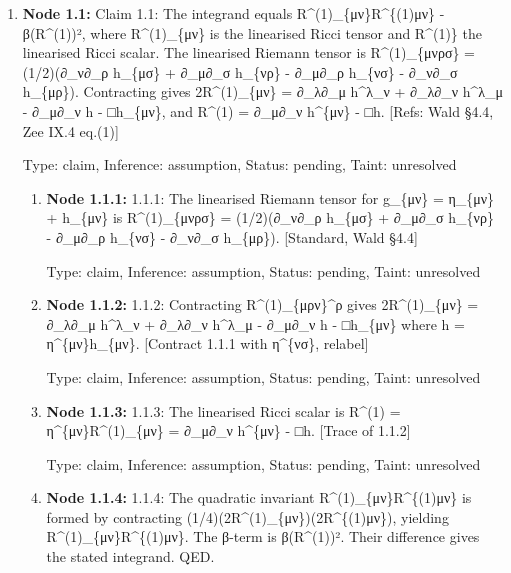 \documentclass{article}
\begin{document}
\begin{enumerate}
\item \textbf{Node 1.1:} Claim 1.1: The integrand equals R\textasciicircum{}(1)\_\{μν\}R\textasciicircum{}\{(1)μν\} - β(R\textasciicircum{}(1))², where R\textasciicircum{}(1)\_\{μν\} is the linearised Ricci tensor and R\textasciicircum{}(1)\} the linearised Ricci scalar. The linearised Riemann tensor is R\textasciicircum{}(1)\_\{μνρσ\} = (1/2)(∂\_ν∂\_ρ h\_\{μσ\} + ∂\_μ∂\_σ h\_\{νρ\} - ∂\_μ∂\_ρ h\_\{νσ\} - ∂\_ν∂\_σ h\_\{μρ\}). Contracting gives 2R\textasciicircum{}(1)\_\{μν\} = ∂\_λ∂\_μ h\textasciicircum{}λ\_ν + ∂\_λ∂\_ν h\textasciicircum{}λ\_μ - ∂\_μ∂\_ν h - □h\_\{μν\}, and R\textasciicircum{}(1) = ∂\_μ∂\_ν h\textasciicircum{}\{μν\} - □h. [Refs: Wald §4.4, Zee IX.4 eq.(1)]

  Type: claim, Inference: assumption, Status: pending, Taint: unresolved

\begin{enumerate}
\item \textbf{Node 1.1.1:} 1.1.1: The linearised Riemann tensor for g\_\{μν\} = η\_\{μν\} + h\_\{μν\} is R\textasciicircum{}(1)\_\{μνρσ\} = (1/2)(∂\_ν∂\_ρ h\_\{μσ\} + ∂\_μ∂\_σ h\_\{νρ\} - ∂\_μ∂\_ρ h\_\{νσ\} - ∂\_ν∂\_σ h\_\{μρ\}). [Standard, Wald §4.4]

  Type: claim, Inference: assumption, Status: pending, Taint: unresolved

\item \textbf{Node 1.1.2:} 1.1.2: Contracting R\textasciicircum{}(1)\_\{μρν\}\textasciicircum{}ρ gives 2R\textasciicircum{}(1)\_\{μν\} = ∂\_λ∂\_μ h\textasciicircum{}λ\_ν + ∂\_λ∂\_ν h\textasciicircum{}λ\_μ - ∂\_μ∂\_ν h - □h\_\{μν\} where h = η\textasciicircum{}\{μν\}h\_\{μν\}. [Contract 1.1.1 with η\textasciicircum{}\{νσ\}, relabel]

  Type: claim, Inference: assumption, Status: pending, Taint: unresolved

\item \textbf{Node 1.1.3:} 1.1.3: The linearised Ricci scalar is R\textasciicircum{}(1) = η\textasciicircum{}\{μν\}R\textasciicircum{}(1)\_\{μν\} = ∂\_μ∂\_ν h\textasciicircum{}\{μν\} - □h. [Trace of 1.1.2]

  Type: claim, Inference: assumption, Status: pending, Taint: unresolved

\item \textbf{Node 1.1.4:} 1.1.4: The quadratic invariant R\textasciicircum{}(1)\_\{μν\}R\textasciicircum{}\{(1)μν\} is formed by contracting (1/4)(2R\textasciicircum{}(1)\_\{μν\})(2R\textasciicircum{}\{(1)μν\}), yielding R\textasciicircum{}(1)\_\{μν\}R\textasciicircum{}\{(1)μν\}. The β-term is β(R\textasciicircum{}(1))². Their difference gives the stated integrand. QED.


\end{enumerate}
\end{enumerate}
\end{document}

